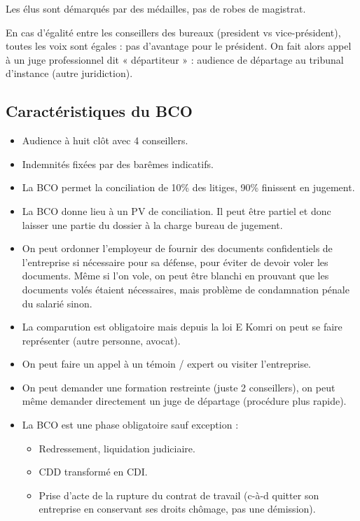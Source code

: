 	Les élus sont démarqués par des médailles, pas de robes de magistrat.
	
	En cas d'égalité entre les conseillers des bureaux (president vs vice-président), toutes les voix sont égales : pas d’avantage pour le président. On fait alors appel à un juge professionnel dit « départiteur » : audience de départage au tribunal d’instance (autre juridiction).
	

\subsection{Caractéristiques du BCO}

	\begin{itemize}
		\item[\textbullet] Audience à huit clôt avec 4 conseillers.
		\item[\textbullet] Indemnités fixées par des barêmes indicatifs.
		\item[\textbullet] La BCO permet la conciliation de 10\% des litiges, 90\% finissent en jugement.
		\item[\textbullet] La BCO donne lieu à un PV de conciliation.
			Il peut être partiel et donc laisser une partie du dossier à la charge bureau de jugement.
		\item[\textbullet] On peut ordonner l’employeur de fournir des documents confidentiels de l’entreprise si nécessaire pour sa défense, pour éviter de devoir voler les documents.
			Même si l’on vole, on peut être blanchi en prouvant que les documents volés étaient nécessaires, mais problème de condamnation pénale du salarié sinon.
		\item[\textbullet] La comparution est obligatoire mais depuis la loi E Komri on peut se faire représenter (autre personne, avocat).
		\item[\textbullet] On peut faire un appel à un témoin / expert ou visiter l'entreprise.
		\item[\textbullet] On peut demander une formation restreinte (juste 2 conseillers), on peut même demander directement un juge de départage (procédure plus rapide).
		\item[\textbullet] La BCO est une phase obligatoire sauf exception :
			\begin{itemize}
				\item[\textopenbullet] Redressement, liquidation judiciaire.
				\item[\textopenbullet] CDD transformé en CDI.
				\item[\textopenbullet] Prise d’acte de la rupture du contrat de travail (c-à-d quitter son entreprise en conservant ses droits chômage, pas une démission).
			\end{itemize}
	\end{itemize}

